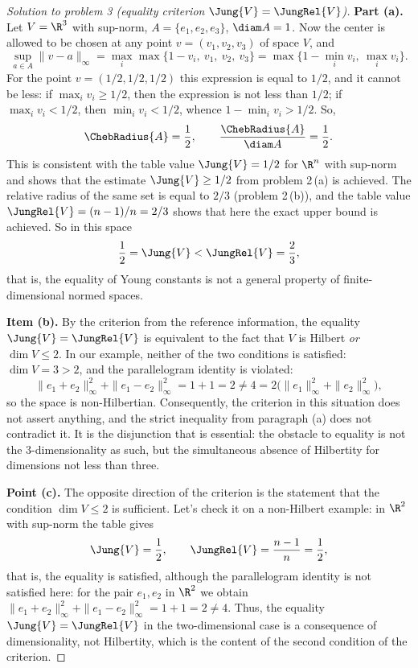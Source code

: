 \documentclass[a4paper,12pt]{report}
\begin{document}
\begin{proof}[Solution to problem \textup{3} \textup{(}equality criterion $\Jung{V} = \JungRel{V}$\textup{)}]

\textbf{Part \textup{(a)}.} Let $V = \R^3$ with sup-norm, $A = \{e_1,e_2,e_3\}$, $\diam A = 1$. Now the center is allowed to be chosen at any point $v = (v_1,v_2,v_3)$ of space $V$, and
\[
\sup_{a \in A} \|v - a\|_\infty = \max_i \max\bigl\{1 - v_i,\ v_1,\ v_2,\ v_3\bigr\} = \max\bigl\{1 - \min_i v_i,\ \max_i v_i\bigr\}.
\]
For the point $v = (1/2,1/2,1/2)$ this expression is equal to $1/2$, and it cannot be less: if $\max_i v_i \ge 1/2$, then the expression is not less than $1/2$; if $\max_i v_i < 1/2$, then $\min_i v_i < 1/2$, whence $1 - \min_i v_i > 1/2$. So,
\[
\ChebRadius{A} = \frac12, \qquad \frac{\ChebRadius{A}}{\diam A} = \frac12.
\]
This is consistent with the table value $\Jung{V} = 1/2$ for $\R^n$ with sup-norm and shows that the estimate $\Jung{V} \ge 1/2$ from problem \textup{2}\,\textup{(a)} is achieved. The relative radius of the same set is equal to $2/3$ \textup{(}problem \textup{2}\,\textup{(b)}\textup{)}, and the table value $\JungRel{V} = (n-1)/n = 2/3$ shows that here the exact upper bound is achieved. So in this space
\[
\frac12 = \Jung{V} < \JungRel{V} = \frac23,
\]
that is, the equality of Young constants is not a general property of finite-dimensional normed spaces.

\textbf{Item \textup{(b)}.} By the criterion from the reference information, the equality $\Jung{V} = \JungRel{V}$ is equivalent to the fact that $V$ is Hilbert \emph{or} $\dim V \le 2$. In our example, neither of the two conditions is satisfied: $\dim V = 3 > 2$, and the parallelogram identity is violated:
\[
\|e_1 + e_2\|_\infty^2 + \|e_1 - e_2\|_\infty^2 = 1 + 1 = 2 \ne 4 = 2\bigl(\|e_1\|_\infty^2 + \|e_2\|_\infty^2\bigr),
\]
so the space is non-Hilbertian. Consequently, the criterion in this situation does not assert anything, and the strict inequality from paragraph \textup{(a)} does not contradict it. It is the disjunction that is essential: the obstacle to equality is not the $3$-dimensionality as such, but the simultaneous absence of Hilbertity for dimensions not less than three.

\textbf{Point \textup{(c)}.} The opposite direction of the criterion is the statement that the condition $\dim V \le 2$ is sufficient. Let's check it on a non-Hilbert example: in $\R^2$ with sup-norm the table gives
\[
\Jung{V} = \frac12, \qquad \JungRel{V} = \frac{n-1}{n} = \frac12,
\]
that is, the equality is satisfied, although the parallelogram identity is not satisfied here: for the pair $e_1, e_2$ in $\R^2$ we obtain $\|e_1+e_2\|_\infty^2 + \|e_1-e_2\|_\infty^2 = 1 + 1 = 2 \ne 4$. Thus, the equality $\Jung{V} = \JungRel{V}$ in the two-dimensional case is a consequence of dimensionality, not Hilbertity, which is the content of the second condition of the criterion.

\end{proof}
\end{document}
